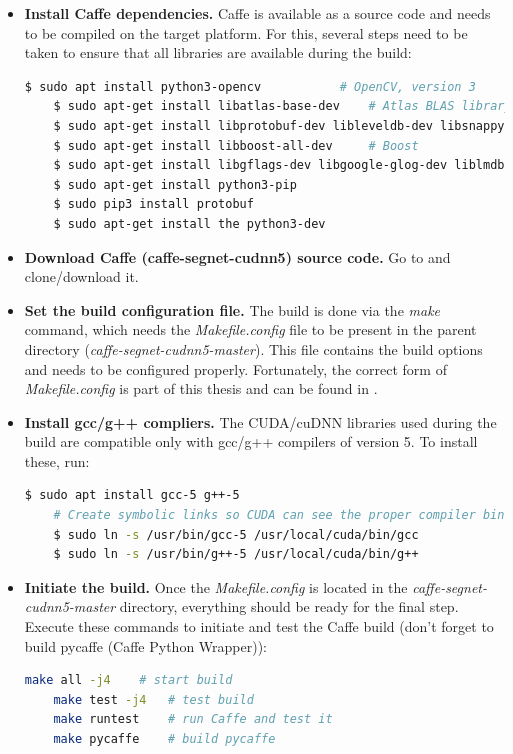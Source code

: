 \begin{itemize}
		
	\item \textbf{Install Caffe dependencies.} Caffe is available as a source code and needs to be compiled on the target platform. For this, several steps need to be taken to ensure that all libraries are available during the build: \cite{caffe}
	
	\begin{lstlisting}[language=bash]
	$ sudo apt install python3-opencv 			# OpenCV, version 3
	$ sudo apt-get install libatlas-base-dev 	# Atlas BLAS library
	$ sudo apt-get install libprotobuf-dev libleveldb-dev libsnappy-dev libopencv-dev libhdf5-serial-dev protobuf-compiler
	$ sudo apt-get install libboost-all-dev		# Boost
	$ sudo apt-get install libgflags-dev libgoogle-glog-dev liblmdb-dev
	$ sudo apt-get install python3-pip
	$ sudo pip3 install protobuf
	$ sudo apt-get install the python3-dev
	\end{lstlisting}
	
	\item \textbf{Download Caffe (caffe-segnet-cudnn5) source code.} Go to \cite{filip_github_caffe} and clone/download it. 
	\item \textbf{Set the build configuration file.} The build is done via the \textit{make} command, which needs the \textit{Makefile.config} file to be present in the parent directory (\textit{caffe-segnet-cudnn5-master}). This file contains the build options and needs to be configured properly. Fortunately, the correct form of \textit{Makefile.config} is part of this thesis and can be found in \cite{filip_github_caffe}. 
	
	\item \textbf{Install gcc/g++ compliers.} The CUDA/cuDNN libraries used during the build are compatible only with gcc/g++ compilers of version 5. To install these, run:
	
	\begin{lstlisting}[language=bash]
	$ sudo apt install gcc-5 g++-5
	# Create symbolic links so CUDA can see the proper compiler binaries
	$ sudo ln -s /usr/bin/gcc-5 /usr/local/cuda/bin/gcc
	$ sudo ln -s /usr/bin/g++-5 /usr/local/cuda/bin/g++
	\end{lstlisting}
	
	\item \textbf{Initiate the build.} Once the \textit{Makefile.config} is located in the \textit{caffe-segnet-cudnn5-master} directory, everything should be ready for the final step. Execute these commands to initiate and test the Caffe build (don't forget to build pycaffe (Caffe Python Wrapper)):
	
	\begin{lstlisting}[language=bash]
	make all -j4	# start build
	make test -j4	# test build
	make runtest	# run Caffe and test it
	make pycaffe	# build pycaffe 
	\end{lstlisting} 	
\end{itemize}





